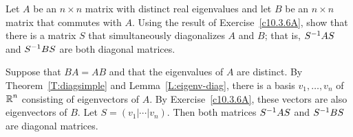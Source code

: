 \documentclass{ximera}
\begin{document}
\begin{exercise} \label{c10.3.6B}
Let $A$ be an $n\times n$ matrix with distinct real eigenvalues and let $B$ 
be an $n\times n$ matrix that commutes with $A$.  Using the result of
Exercise~\ref{c10.3.6A}, show that there is a matrix $S$ that simultaneously
diagonalizes $A$ and $B$; that is, $S^{-1} AS$ and $S^{-1} BS$ are both
diagonal matrices.

\begin{solution}

\soln
Suppose that $BA=AB$ and that the eigenvalues of $A$ are distinct. 
By Theorem~\ref{T:diagsimple} and Lemma~\ref{L:eigenv-diag}, 
there is a basis $v_1,\ldots,v_n$ of $\mbox{$\mathbb{R}$}^n$ consisting of eigenvectors of $A$.  By 
Exercise~\ref{c10.3.6A}, these vectors are also eigenvectors of $B$.  Let 
$S=(v_1|\cdots|v_n)$.  Then both matrices $S^{-1} AS$ and $S^{-1} BS$ are diagonal 
matrices.

\end{solution}
\end{exercise}
\end{document}
